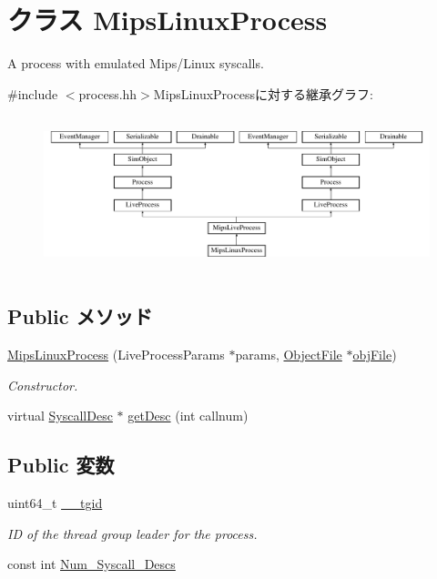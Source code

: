 \hypertarget{classMipsLinuxProcess}{
\section{クラス MipsLinuxProcess}
\label{classMipsLinuxProcess}
}


A process with emulated Mips/Linux syscalls.  


{\ttfamily \#include $<$process.hh$>$}MipsLinuxProcessに対する継承グラフ:\begin{figure}[H]
\begin{center}
\leavevmode
\includegraphics[height=4.55285cm]{classMipsLinuxProcess}
\end{center}
\end{figure}
\subsection*{Public メソッド}
\begin{DoxyCompactItemize}
\item 
\hyperlink{classMipsLinuxProcess_a34d6e691166d7f1b7d336afba7b5d54f}{MipsLinuxProcess} (LiveProcessParams $\ast$params, \hyperlink{classObjectFile}{ObjectFile} $\ast$\hyperlink{classLiveProcess_ab6cfcfa7903c66267b3e0351c3caa809}{objFile})
\begin{DoxyCompactList}\small\item\em Constructor. \item\end{DoxyCompactList}\item 
virtual \hyperlink{classSyscallDesc}{SyscallDesc} $\ast$ \hyperlink{classMipsLinuxProcess_aebbff609a7235342925445690acf5ee8}{getDesc} (int callnum)
\end{DoxyCompactItemize}
\subsection*{Public 変数}
\begin{DoxyCompactItemize}
\item 
uint64\_\-t \hyperlink{classMipsLinuxProcess_a8ac0d1d5ebb59917141aa3e5293f6dfd}{\_\-\_\-tgid}
\begin{DoxyCompactList}\small\item\em ID of the thread group leader for the process. \item\end{DoxyCompactList}\item 
const int \hyperlink{classMipsLinuxProcess_a9534988905c6f5c8c57c4b6a7b179fea}{Num\_\-Syscall\_\-Descs}
\end{DoxyCompactItemize}
